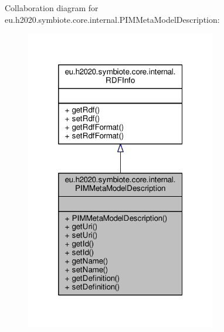 Collaboration diagram for eu.\+h2020.\+symbiote.\+core.\+internal.\+P\+I\+M\+Meta\+Model\+Description\+:
\nopagebreak
\begin{figure}[H]
\begin{center}
\leavevmode
\includegraphics[width=236pt]{classeu_1_1h2020_1_1symbiote_1_1core_1_1internal_1_1PIMMetaModelDescription__coll__graph}
\end{center}
\end{figure}
